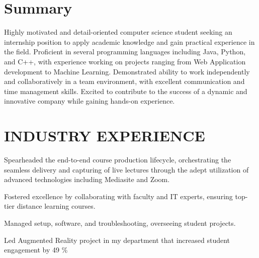 \documentclass[a4paper]{deedy-resume} %
\begin{document}
\hfill
%
%
\begin{minipage}[t]{0.66\textwidth} %

\section{Summary}
Highly motivated and detail-oriented computer science student seeking an internship position to apply academic knowledge and gain practical experience in the field. Proficient in several programming languages including Java, Python, and C++, with experience working on projects ranging from Web Application development to Machine Learning. Demonstrated ability to work independently and collaboratively in a team environment, with excellent communication and time management skills. Excited to contribute to the success of a dynamic and innovative company while gaining hands-on experience.
\sectionspace

\section{INDUSTRY EXPERIENCE}


\vspace{\topsep} 

\begin{tightitemize}
\item Spearheaded the end-to-end course production lifecycle, orchestrating the seamless delivery and capturing of live lectures through the adept utilization of advanced technologies including Mediasite and Zoom.
\item Fostered excellence by collaborating with faculty and IT experts, ensuring top-tier distance learning courses.
\item Managed setup, software, and troubleshooting, overseeing student projects.
\item Led Augmented Reality project in my department that increased student engagement by 49 \%
\end{tightitemize}


\end{minipage}
\end{document}
